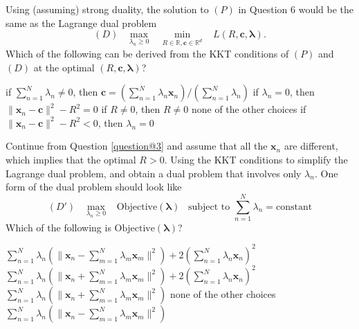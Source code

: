 \documentclass[a4paper,10pt]{exam}
\begin{document}
\begin{questions}
	\question Using (assuming) strong duality, the solution to $(P)$ in Question 6 would be the same as the Lagrange dual problem
	\[(D) \; \; \; \max_{\lambda_n \ge 0} \;\;\; \min_{R \in \mathbb{R}, \mathbf{c} \in \mathbb{R}^d}  \;\;\;  L(R, \mathbf{c}, {\boldsymbol\lambda}).\]
	Which of the following can be derived from the KKT conditions of $(P)$ and $(D)$ at the optimal $(R, \mathbf{c}, {\boldsymbol\lambda})$?
	\begin{checkboxes}
		\CorrectChoice if $\sum_{n=1}^N \lambda_n \neq 0$, then $\mathbf{c} = \left(\sum_{n=1}^N \lambda_n \mathbf{x}_n\right) \Big/ \left(\sum_{n=1}^N \lambda_n\right)$
		\choice if $\lambda_n = 0$, then $\|\mathbf{x}_n - \mathbf{c}\|^2 - R^2 = 0$
		\CorrectChoice if $R \neq 0$, then $R \neq 0$
		\choice none of the other choices
		\choice if $\|\mathbf{x}_n - \mathbf{c}\|^2 - R^2 < 0$, then $\lambda_n = 0$
   \end{checkboxes}
   
   \question Continue from Question \ref{question@3} and assume that all the $\mathbf{x}_n$ are different, which implies that the optimal $R>0$. Using the KKT conditions to simplify the Lagrange dual problem, and obtain a dual problem that involves only $\lambda_n$. One form of the dual problem should look like
   \[(D') \; \; \; \max_{\lambda_n \ge 0} \; \; \; \mbox{Objective}(\boldsymbol\lambda) \; \; \; \mbox{subject to } \sum_{n=1}^N \lambda_n = \mbox{constant}\]
   Which of the following is $\mbox{Objective}(\boldsymbol\lambda)$?
   
   \begin{checkboxes}
   	 \choice $\sum_{n=1}^N \lambda_n (\|\mathbf{x}_n - \sum_{m=1}^N \lambda_m \mathbf{x}_m \|^2) + 2(\sum_{n=1}^N \lambda_n \mathbf{x}_n)^2$
   	 \choice $\sum_{n=1}^N \lambda_n (\|\mathbf{x}_n + \sum_{m=1}^N \lambda_m \mathbf{x}_m \|^2) + 2(\sum_{n=1}^N \lambda_n \mathbf{x}_n)^2$
   	 \choice $\sum_{n=1}^N \lambda_n (\|\mathbf{x}_n + \sum_{m=1}^N \lambda_m \mathbf{x}_m \|^2)$
   	 \choice none of the other choices
   	 \CorrectChoice $\sum_{n=1}^N \lambda_n (\|\mathbf{x}_n - \sum_{m=1}^N \lambda_m \mathbf{x}_m \|^2)$
   \end{checkboxes}
   

\end{questions}
\end{document}
